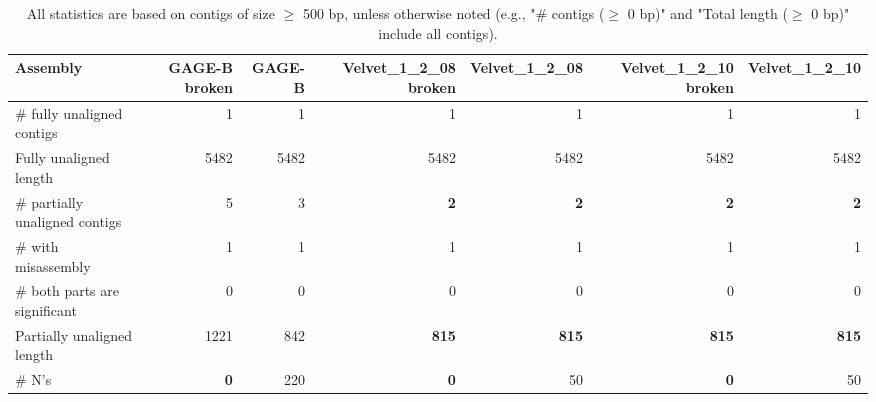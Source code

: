 \documentclass[12pt,a4paper]{article}
\begin{document}
\begin{table}[ht]
\begin{center}
\caption{All statistics are based on contigs of size $\geq$ 500 bp, unless otherwise noted (e.g., "\# contigs ($\geq$ 0 bp)" and "Total length ($\geq$ 0 bp)" include all contigs).}
\begin{tabular}{|l*{6}{|r}|}
\hline
Assembly & GAGE-B broken & GAGE-B & Velvet\_1\_2\_08 broken & Velvet\_1\_2\_08 & Velvet\_1\_2\_10 broken & Velvet\_1\_2\_10 \\ \hline
\# fully unaligned contigs & 1 & 1 & 1 & 1 & 1 & 1 \\ \hline
Fully unaligned length & 5482 & 5482 & 5482 & 5482 & 5482 & 5482 \\ \hline
\# partially unaligned contigs & 5 & 3 & {\bf 2} & {\bf 2} & {\bf 2} & {\bf 2} \\ \hline
\hspace{5mm}\# with misassembly & 1 & 1 & 1 & 1 & 1 & 1 \\ \hline
\hspace{5mm}\# both parts are significant & 0 & 0 & 0 & 0 & 0 & 0 \\ \hline
Partially unaligned length & 1221 & 842 & {\bf 815} & {\bf 815} & {\bf 815} & {\bf 815} \\ \hline
\# N's & {\bf 0} & 220 & {\bf 0} & 50 & {\bf 0} & 50 \\ \hline
\end{tabular}
\end{center}
\end{table}
\end{document}
